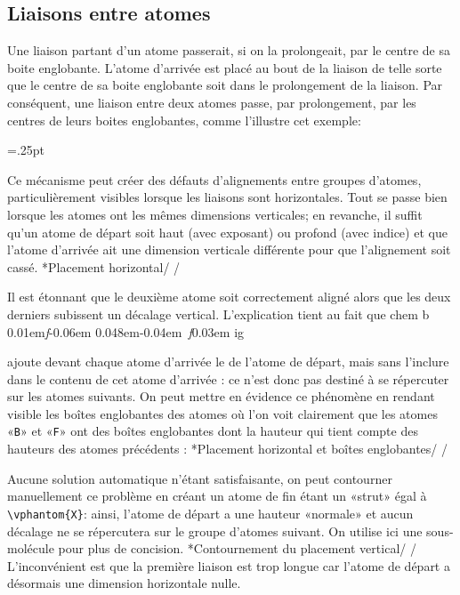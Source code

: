 \documentclass[10pt,french]{article}
\makeatletter
\newcommand\make@car@active[1]{%
	\catcode`#1\active
	\begingroup
		\lccode`\~`#1\relax
		\lowercase{\endgroup\def~}%
}
\newif\if@exstar
\newcommand\exemple{%
	\begingroup
	\parskip\z@
	\@makeother\;\@makeother\!\@makeother\?\@makeother\:%
	\@ifstar{\@exstartrue\exemple@}{\@exstarfalse\exemple@}}
\newcommand\exemple@[2][65]{%
	\medbreak\noindent
	\begingroup
		\let\do\@makeother\dospecials
		\make@car@active\ { {}}%
		\make@car@active\^^M{\par\leavevmode}%
		\make@car@active\^^I{\space\space}%
		\make@car@active\,{\leavevmode\kern\z@\string,}%
		\make@car@active\-{\leavevmode\kern\z@\string-}%
		\make@car@active\>{\leavevmode\kern\z@\string>}%
		\make@car@active\<{\leavevmode\kern\z@\string<}%
		\exemple@@{#1}{#2}%
}
\newcommand\exemple@@[3]{%
	\def\@tempa##1#3{\exemple@@@{#1}{#2}{##1}}%
	\@tempa
}
\newcommand\exemple@@@[3]{%
	\xdef\the@code{#3}%
	\endgroup
	\if@exstar
		\begingroup
			\fboxrule0.4pt
			\let\breakboxparindent\z@
			\def\bkvz@bottom{\hrule\@height\fboxrule}%
			\let\bkvz@before@breakbox\relax
			\def\bkvz@set@linewidth{\advance\linewidth\dimexpr-2\fboxrule-2\fboxsep}%
			\def\bkvz@left{\vrule\@width\fboxrule\hskip\fboxsep}%
			\def\bkvz@right{\hskip\fboxsep\vrule\@width\fboxrule}%
			\def\bkvz@top{\hbox to \hsize{%
				\vrule\@width\fboxrule\@height\fboxrule
				\leaders\bkvz@bottom\hfill
				\sffamily
				\fboxsep\z@
				\colorbox{black}{\kern0.25em\color{white}\footnotesize\lower0.5ex\hbox{\strut#2}\kern0.25em}%
				\leaders\bkvz@bottom\hfill
				\vrule\@width\fboxrule\@height\fboxrule}}%
			\breakbox
				\kern.5ex\relax
				\ttfamily\footnotesize\the@code\par
				\normalfont
				\kern3pt
				\hrule height0.1pt width\linewidth depth0.1pt
				\vskip5pt
				\rightskip0pt plus 1fill
				\everypar{{\color{lightgray}\rlap{\vrule height0.1pt width\linewidth depth0.1pt}}\hskip0pt plus 1fill}%
				\newlinechar`\^^M\everyeof{\noexpand}\scantokens{#3}\par
			\endbreakbox
		\endgroup
	\else
		\vskip0.5ex
		\boxput*(0,1)
			{\fboxsep\z@
			\hbox{\sffamily\colorbox{black}{\leavevmode\kern0.25em{\color{white}\footnotesize\strut#2}\kern0.25em}}%
			}%
			{\fboxsep5pt
			\fbox{%
				$\vcenter{\hsize\dimexpr0.#1\linewidth-\fboxsep-\fboxrule\relax
					\kern5pt\parskip0pt \ttfamily\footnotesize\the@code}%
				\vcenter{\kern5pt\hsize\dimexpr\linewidth-0.#1\linewidth-\fboxsep-\fboxrule\relax
					\everypar{{\color{lightgray}\rlap{\vrule height0.1pt width\dimexpr\linewidth-0.#1\linewidth-\fboxsep-\fboxrule depth0.1pt}}}%
					\footnotesize\newlinechar`\^^M\everyeof{\noexpand}\scantokens{#3}}$%
				}%
			}%
	\fi
	\medbreak
	\endgroup
}
\newcommand\falseverb[1]{{\ttfamily\detokenize\expandafter{\string#1}}}
\DeclareRobustCommand\CF{%
	\textsf{%
		chem%
		\if\string b\detokenize\expandafter{\f@series}%
			\lower0.01em\hbox{\itshape f}\kern-0.06em
		\else
			\lower0.048em\hbox{\kern-0.04em \itshape f}\kern0.03em
		\fi ig%
		}%
		\xspace
}
\makeatother
\begin{document}
\subsection{Liaisons entre atomes}\label{liaisonentreatomes}
Une liaison partant d'un atome passerait, si on la prolongeait, par le centre de sa boite englobante. L'atome d'arrivée est placé au bout de la liaison de telle sorte que le centre de sa boite englobante soit dans le prolongement de la liaison. Par conséquent, une liaison entre deux atomes passe, par prolongement, par les centres de leurs boites englobantes, comme l'illustre cet exemple:
\begin{center}
\fboxsep=.25pt
\renewcommand\printatom[1]{\fbox{\ensuremath{\mathrm{#1}}}}
\Large
{}
\end{center}
Ce mécanisme peut créer des défauts d'alignements entre groupes d'atomes, particulièrement visibles lorsque les liaisons sont horizontales. Tout se passe bien lorsque les atomes ont les mêmes dimensions verticales; en revanche, il suffit qu'un atome de départ soit haut (avec exposant) ou profond (avec indice) et que l'atome d'arrivée ait une dimension verticale différente pour que l'alignement soit cassé.
\exemple*{Placement horizontal}/\Huge{}
\qquad
{}/

Il est étonnant que le deuxième atome soit correctement aligné alors que les deux derniers subissent un décalage vertical. L'explication tient au fait que \CF ajoute devant chaque atome d'arrivée le \falseverb{\vphantom} de l'atome de départ, mais sans l'inclure dans le contenu de cet atome d'arrivée : ce \falseverb{\vphantom} n'est donc pas destiné à se répercuter sur les atomes suivants. On peut mettre en évidence ce phénomène en rendant visible les boîtes englobantes des atomes où l'on voit clairement que les atomes «\verb-B-» et «\verb-F-» ont des boîtes englobantes dont la hauteur qui tient compte des hauteurs des atomes précédents :
\exemple*{Placement horizontal et boîtes englobantes}/\Huge{}
\fboxsep=0pt
\renewcommand\printatom[1]{\fbox{\ensuremath{\mathrm#1}}}
\qquad
{}/

Aucune solution automatique n'étant satisfaisante, on peut contourner manuellement ce problème en créant un atome de fin étant un «strut» égal à \verb|\vphantom{X}|: ainsi, l'atome de départ a une hauteur «normale» et aucun décalage ne se répercutera sur le groupe d'atomes suivant. On utilise ici une sous-molécule pour plus de concision.
\exemple*{Contournement du placement vertical}/\Huge{}
\I{\vphantom{X}}
\qquad
{}/
L'inconvénient est que la première liaison est trop longue car l'atome de départ a désormais une dimension horizontale nulle.
\end{document}
